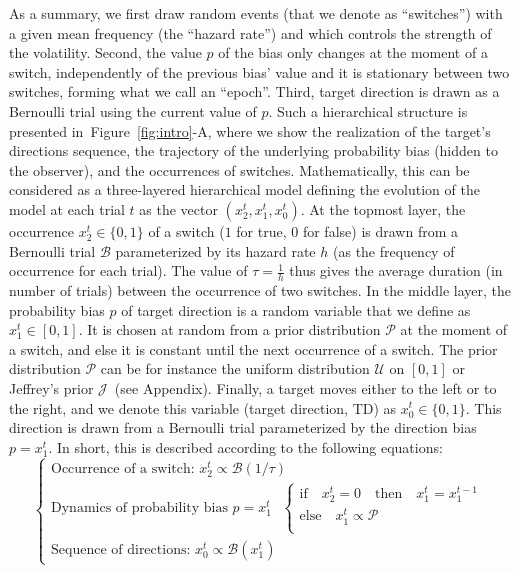\documentclass[10pt,letterpaper]{article}
\newcommand{\choice}[1]{ %
	\left\{ %
		\begin{array}{l} #1 \end{array} %
	\right. }
\newcommand{\eql}[1]{\begin{equation}#1\end{equation}}
\newcommand{\Bb}{\mathcal{B}}
\newcommand{\Jj}{\mathcal{J}}
\newcommand{\Pp}{\mathcal{P}}
\newcommand{\Uu}{\mathcal{U}}
\newcommand{\seeFig}[1]{Figure~\ref{fig:#1}}
\newcommand{\seeApp}[1]{Appendix}
\begin{document}
As a summary, we first draw random events (that we denote as ``switches'')
with a given mean frequency (the ``hazard rate'') and which controls the strength of the volatility.
Second, the value $p$ of the bias only changes at the moment of a switch,
independently of the previous bias' value
and it is stationary between two switches, forming what we call an ``epoch''.
Third, target direction is drawn as a Bernoulli trial using the current value of $p$.
Such a hierarchical structure is presented in~\seeFig{intro}-A,
where we show the realization of the target's directions sequence,
the trajectory of the underlying probability bias (hidden to the observer), and
the occurrences of switches.
Mathematically, this can be considered as a three-layered hierarchical model
defining the evolution of the model at each trial $t$ as the vector  $(x_2^t, x_1^t, x_0^t)$.
At the topmost layer,
the occurrence $x_2^t \in \{ 0, 1 \}$ of a switch ($1$ for true, $0$ for false)
is  drawn from a Bernoulli trial $\Bb$ parameterized by its hazard rate $h$
(as the frequency of occurrence for each trial).
The value of $\tau=\frac 1 h$ thus gives the average duration (in number of trials)
between the occurrence of two switches.
In the middle layer, the probability bias $p$ of target direction
is a random variable that we define as $x_1^t \in [0, 1]$.
It is chosen at random from a prior distribution $\Pp$
at the moment of a switch,
and else it is constant until the next occurrence of a switch.
The prior distribution $\Pp$ can be for instance
the uniform distribution $\Uu$ on $ [ 0, 1 ] $ or
Jeffrey's prior $\Jj$~(see \seeApp{bcp}).
Finally, a target moves either to the left or to the right,
and we denote this variable (target direction, TD) as $x_0^t \in \{ 0, 1 \}$.
This direction is drawn from a Bernoulli trial
parameterized by the direction bias $p=x_1^t$.
In short, this is described according to the following equations:
 \eql{\choice{
\text{Occurrence of a switch: } x_2^t \propto \Bb(1/\tau) \\
\text{Dynamics of probability bias $p=x_1^t$ }
 \choice{\text{if} \quad x_2^t=0 \quad \text{then} \quad  x_1^t = x_1^{t-1} \\
 \text{else} \quad x_1^t \propto \Pp  \\
 } \\
\text{Sequence of directions: } x_0^t \propto \Bb(x_1^t)
 }\label{eq:bsm}}
\end{document}
